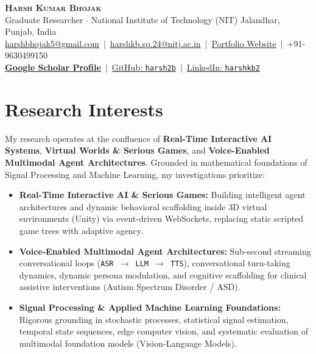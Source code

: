 \documentclass[10pt,a4paper]{article}
\begin{document}
\begin{center}
    {\LARGE \textbf{\textsc{Harsh Kumar Bhojak}}} \\[3pt]
    \small Graduate Researcher $\cdot$ National Institute of Technology (NIT) Jalandhar, Punjab, India \\[2.5pt]
    \href{mailto:harshbhojak5@gmail.com}{harshbhojak5@gmail.com} \,$\vert$\, 
    \href{mailto:harshkb.sp.24@nitj.ac.in}{harshkb.sp.24@nitj.ac.in} \,$\vert$\, 
    \href{https://harsh2b.github.io/}{Portfolio Website} \,$\vert$\, 
    +91-9630499150 \\[2pt]
    \href{https://scholar.google.com/citations?user=AERr9JFapsS7cVs0AKu8EHFLM03utnpNz85mBmw8NIb3SSI81c03wESY0JJN}{\textbf{Google Scholar Profile}} \,$\vert$\, 
    \href{https://github.com/harsh2b}{GitHub: \texttt{harsh2b}} \,$\vert$\, 
    \href{https://www.linkedin.com/in/harshkb2}{LinkedIn: \texttt{harshkb2}}
\end{center}

\vspace{-6pt}

\section*{Research Interests}
My research operates at the confluence of \textbf{Real-Time Interactive AI Systems}, \textbf{Virtual Worlds \& Serious Games}, and \textbf{Voice-Enabled Multimodal Agent Architectures}. Grounded in mathematical foundations of Signal Processing and Machine Learning, my investigations prioritize:
\begin{itemize}
    \item \textbf{Real-Time Interactive AI \& Serious Games:} Building intelligent agent architectures and dynamic behavioral scaffolding inside 3D virtual environments (Unity) via event-driven WebSockets, replacing static scripted game trees with adaptive agency.
    \item \textbf{Voice-Enabled Multimodal Agent Architectures:} Sub-second streaming conversational loops (\texttt{ASR $\rightarrow$ LLM $\rightarrow$ TTS}), conversational turn-taking dynamics, dynamic persona modulation, and cognitive scaffolding for clinical assistive interventions (Autism Spectrum Disorder / ASD).
    \item \textbf{Signal Processing \& Applied Machine Learning Foundations:} Rigorous grounding in stochastic processes, statistical signal estimation, temporal state sequences, edge computer vision, and systematic evaluation of multimodal foundation models (Vision-Language Models).
\end{itemize}
\end{document}
